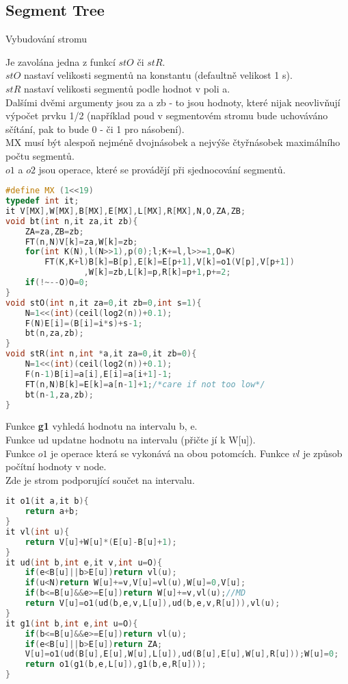 \documentclass[11pt]{article}
\begin{document}
\subsection{Segment Tree}
\begin{center}
Vybudování stromu
\end{center}
Je zavolána jedna z funkcí $stO$ či $stR$.
\\$stO$ nastaví velikosti segmentů na konstantu (defaultně velikost 1 \textsf{s}).
\\$stR$ nastaví velikosti segmentů podle hodnot v poli \textsf{a}.
\\Dalšími dvěmi argumenty jsou \textsf{za} a \textsf{zb} - to jsou hodnoty, které nijak neovlivňují výpočet prvku 1/2 (například poud v segmentovém stromu bude uchováváno sčítání, pak to bude 0 - či 1 pro násobení).
\\\textsf{MX} musí být alespoň nejméně dvojnásobek a nejvýše čtyřnásobek maximálního počtu segmentů.
\\$o1$ a $o2$ jsou operace, které se provádějí při sjednocování segmentů.
\begin{lstlisting}[language=C++]
#define MX (1<<19)
typedef int it;
it V[MX],W[MX],B[MX],E[MX],L[MX],R[MX],N,O,ZA,ZB;
void bt(int n,it za,it zb){
    ZA=za,ZB=zb;
    FT(n,N)V[k]=za,W[k]=zb;
    for(int K(N),l(N>>1),p(0);l;K+=l,l>>=1,O=K)
        FT(K,K+l)B[k]=B[p],E[k]=E[p+1],V[k]=o1(V[p],V[p+1])
                ,W[k]=zb,L[k]=p,R[k]=p+1,p+=2;
    if(!~--O)O=0;
}
void stO(int n,it za=0,it zb=0,int s=1){
    N=1<<(int)(ceil(log2(n))+0.1);
    F(N)E[i]=(B[i]=i*s)+s-1;
    bt(n,za,zb);
}
void stR(int n,int *a,it za=0,it zb=0){
    N=1<<(int)(ceil(log2(n))+0.1);
    F(n-1)B[i]=a[i],E[i]=a[i+1]-1;
    FT(n,N)B[k]=E[k]=a[n-1]+1;/*care if not too low*/
    bt(n-1,za,zb);
}
\end{lstlisting}
Funkce \textbf{g1} vyhledá hodnotu na intervalu \textsf{b}, \textsf{e}.
\\Funkce ud updatne hodnotu na intervalu (přičte jí k W[u]).
\\Funkce $o1$ je operace která se vykonává na obou potomcích. Funkce $vl$ je způsob počítní hodnoty v node.
\\Zde je strom podporující součet na intervalu.
\begin{lstlisting}[language=C++]
it o1(it a,it b){
    return a+b;
}
it vl(int u){
    return V[u]+W[u]*(E[u]-B[u]+1);
}
it ud(int b,int e,it v,int u=O){
    if(e<B[u]||b>E[u])return vl(u);
    if(u<N)return W[u]+=v,V[u]=vl(u),W[u]=0,V[u];
    if(b<=B[u]&&e>=E[u])return W[u]+=v,vl(u);//MD
    return V[u]=o1(ud(b,e,v,L[u]),ud(b,e,v,R[u])),vl(u);
}
it g1(int b,int e,int u=O){
    if(b<=B[u]&&e>=E[u])return vl(u);
    if(e<B[u]||b>E[u])return ZA;
    V[u]=o1(ud(B[u],E[u],W[u],L[u]),ud(B[u],E[u],W[u],R[u]));W[u]=0;
    return o1(g1(b,e,L[u]),g1(b,e,R[u]));
}
\end{lstlisting}
\end{document}

